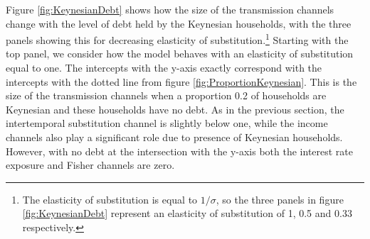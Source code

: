 \documentclass[titlepage]{\econtex}\newcommand{\texname}{ConsumptionHeterogeneity}
\begin{document}
Figure \ref{fig:KeynesianDebt} shows how the size of the transmission channels change with the level of debt held by the Keynesian households, with the three panels showing this for decreasing elasticity of substitution.\footnote{The elasticity of substitution is equal to $1/\sigma$, so the three panels in figure \ref{fig:KeynesianDebt} represent an elasticity of substitution of 1, 0.5 and 0.33 respectively.} Starting with the top panel, we consider how the model behaves with an elasticity of substitution equal to one. The intercepts with the y-axis exactly correspond with the intercepts with the dotted line from figure \ref{fig:ProportionKeynesian}. This is the size of the transmission channels when a proportion 0.2 of households are Keynesian and these households have no debt. As in the previous section, the intertemporal substitution channel is slightly below one, while the income channels also play a significant role due to presence of Keynesian households. However, with no debt at the intersection with the y-axis both the interest rate exposure and Fisher channels are zero.
\end{document}
